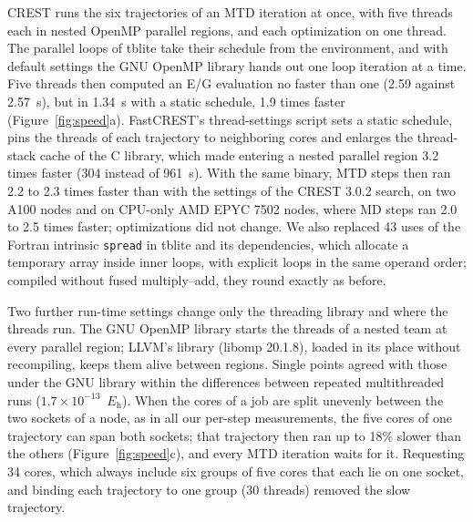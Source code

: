\documentclass[journal=jctcce,manuscript=article]{achemso}
\newcommand{\Eh}{\ensuremath{E_\mathrm{h}}}
\begin{document}
CREST runs the six trajectories of an MTD iteration at once, with five threads each in nested OpenMP parallel regions,\cite{openmp} and each optimization on one thread. The parallel loops of tblite take their schedule from the environment, and with default settings the GNU OpenMP library hands out one loop iteration at a time. Five threads then computed an E/G evaluation no faster than one (2.59 against 2.57~s), but in 1.34~s with a static schedule, 1.9 times faster (Figure~\ref{fig:speed}a). FastCREST's thread-settings script sets a static schedule, pins the threads of each trajectory to neighboring cores and enlarges the thread-stack cache of the C library, which made entering a nested parallel region 3.2 times faster (304 instead of 961~\textmu s). With the same binary, MTD steps then ran 2.2 to 2.3 times faster than with the settings of the CREST 3.0.2 search, on two A100 nodes and on CPU-only AMD EPYC 7502 nodes, where MD steps ran 2.0 to 2.5 times faster; optimizations did not change. We also replaced 43 uses of the Fortran intrinsic \texttt{spread} in tblite and its dependencies, which allocate a temporary array inside inner loops, with explicit loops in the same operand order; compiled without fused multiply--add, they round exactly as before.

Two further run-time settings change only the threading library and where the threads run. The GNU OpenMP library starts the threads of a nested team at every parallel region; LLVM's library (libomp 20.1.8), loaded in its place without recompiling, keeps them alive between regions. Single points agreed with those under the GNU library within the differences between repeated multithreaded runs ($1.7\times10^{-13}$~\Eh). When the cores of a job are split unevenly between the two sockets of a node, as in all our per-step measurements, the five cores of one trajectory can span both sockets; that trajectory then ran up to 18\% slower than the others (Figure~\ref{fig:speed}c), and every MTD iteration waits for it. Requesting 34 cores, which always include six groups of five cores that each lie on one socket, and binding each trajectory to one group (30 threads) removed the slow trajectory.
\end{document}
